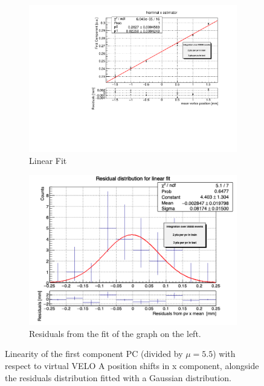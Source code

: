 \begin{samepage}
\begin{figure}
    \centering
    \begin{subfigure}{0.48\textwidth}
    \includegraphics[width=\linewidth]{figures/x_fit_veloA_MC_normalized.pdf}
    \caption{Linear Fit}\label{fig:x_veloA_fit_MC}
    \end{subfigure}
    \begin{subfigure}{0.48\textwidth}
    \includegraphics[width=\linewidth]{figures/x_res_veloA_MC.png}
    \caption{Residuals from the fit of the graph on the left. }\label{fig:x_veloA_res_MC}
    \end{subfigure}
    \caption{Linearity of the first component PC (divided by $\mu=5.5$) with respect to virtual VELO A position shifts in x component, alongside the residuals distribution fitted with a Gaussian distribution.}

\end{figure}
\end{samepage}
